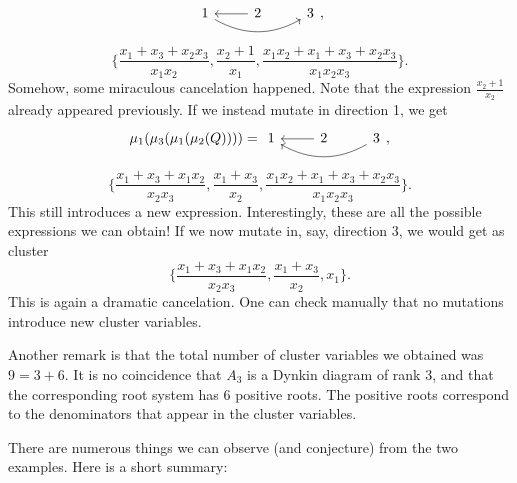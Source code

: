 \documentclass{article}
\begin{document}
\begin{example}
\begin{equation*}
\begin{tikzcd}
			1 \rar[leftarrow] \ar[rr, bend right] & 2 & 3
		\end{tikzcd},
	\end{equation*}
	\begin{equation*}
		\{\frac{x_1 + x_3 + x_2x_3}{x_1x_2}, \frac{x_2 + 1}{x_1}, \frac{x_1 x_2 + x_1 + x_3 + x_2 x_3}{x_1x_2x_3}\}.
	\end{equation*}
	Somehow, some miraculous cancelation happened.
	Note that the expression $\frac{x_2 + 1}{x_2}$ already appeared previously.
	If we instead mutate in direction 1, we get
	\begin{equation*}
		\mu_1(\mu_3(\mu_1(\mu_2(Q)))) =
		\begin{tikzcd}
			1 \rar[leftarrow] \ar[rr,leftarrow, bend right] & 2 & 3
		\end{tikzcd},
	\end{equation*}
	\begin{equation*}
		\{\frac{x_1 + x_3 + x_1x_2}{x_2x_3}, \frac{x_1 + x_3}{x_2}, \frac{x_1 x_2 + x_1 + x_3 + x_2 x_3}{x_1x_2x_3}\}.
	\end{equation*}
	This still introduces a new expression.
	Interestingly, these are all the possible expressions we can obtain!
	If we now mutate in, say, direction 3, we would get as cluster
	\begin{equation*}
		\{\frac{x_1 + x_3 + x_1x_2}{x_2x_3}, \frac{x_1 + x_3}{x_2}, x_1 \}.
	\end{equation*}
	This is again a dramatic cancelation. One can check manually
	that no mutations introduce new cluster variables.

	Another remark is that the total number of cluster variables we obtained was $9 = 3 +
		6$. It is no coincidence that $A_3$ is a Dynkin diagram of rank 3, and that the
	corresponding root system has $6$ positive roots. The positive roots correspond to the
	denominators that appear in the cluster variables.
\end{example}
There are numerous things we can observe (and conjecture) from the two examples.
Here is a short summary:
\end{document}
